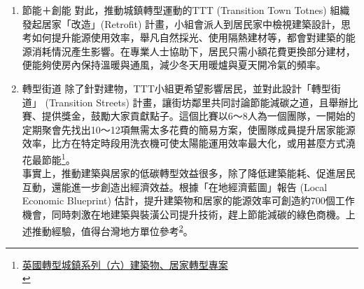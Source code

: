 \documentclass[a4paper,12pt]{article}
\begin{document}
\begin{enumerate}
由於在地貨幣無法在其他城鎮使用，因此TTT組織會努力行銷，鼓勵觀光客下次再回來消費，才能把沒用完的托特尼斯鎊花光，替地方增加回頭客。從環境角度審視的效益也不錯，因加入在地貨幣的商家多屬餐飲服務類，採購食材和物料會用在地貨幣向附近的供應商採買，藉此大為縮短了食物運輸里程\footnote{\href{https://lowestc.blogspot.com/2017/02/blog-post\_69.html}{英國轉型城鎮系列（四）城鎮韌性專案之「在地貨幣」}\\}。\\
\item 節能＋創能
\label{sec:org57e49b1}
對此，推動城鎮轉型運動的TTT (Transition Town Totnes) 組織發起居家「改造」(Retrofit) 計畫，小組會派人到居民家中檢視建築設計，思考如何提升能源使用效率，舉凡自然採光、使用隔熱建材等，都會對建築的能源消耗情況產生影響。在專業人士協助下，居民只需小額花費更換部分建材，便能夠使房內保持溫暖與通風，減少冬天用暖爐與夏天開冷氣的頻率。\\
\item 轉型街道
\label{sec:org9c7fbbc}
除了針對建物，TTT小組更希望影響居民，並對此設計「轉型街道」 (Transition Streets) 計畫，讓街坊鄰里共同討論節能減碳之道，且舉辦比賽、提供獎金，鼓勵大家貢獻點子。這個比賽以6～8人為一個團隊，一開始的定期聚會先找出10～12項無需太多花費的簡易方案，使團隊成員提升居家能源效率，比方在特定時段用洗衣機可使太陽能運用效率最大化，或用甚麼方式澆花最節能\footnote{\href{https://lowestc.blogspot.com/2017/07/blog-post\_17.html}{英國轉型城鎮系列（六）建築物、居家轉型專案 }\\\label{org87f7168}}。\\

事實上，推動建築與居家的低碳轉型效益很多，除了降低建築能耗、促進居民互動，還能進一步創造出經濟效益。根據「在地經濟藍圖」報告 (Local Economic Blueprint) 估計，提升建築物和居家的能源效率可創造約700個工作機會，同時刺激在地建築與裝潢公司提升技術，趕上節能減碳的綠色商機。上述推動經驗，值得台灣地方單位參考\textsuperscript{\ref{org87f7168}}。\\
\end{enumerate}
\end{document}
